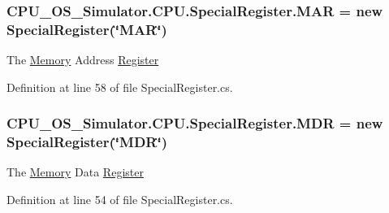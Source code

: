 \subsubsection[{M\+A\+R}]{ C\+P\+U\+\_\+\+O\+S\+\_\+\+Simulator.\+C\+P\+U.\+Special\+Register.\+M\+A\+R = new {\bf Special\+Register}(\char`\"{}M\+A\+R\char`\"{})\hspace{0.3cm}{\ttfamily [static]}}\label{class_c_p_u___o_s___simulator_1_1_c_p_u_1_1_special_register_a2ae89cee8b74f9985f43ee4e6f994bad}


The \hyperlink{namespace_c_p_u___o_s___simulator_1_1_memory}{Memory} Address \hyperlink{class_c_p_u___o_s___simulator_1_1_c_p_u_1_1_register}{Register} 



Definition at line 58 of file Special\+Register.\+cs.

\hypertarget{class_c_p_u___o_s___simulator_1_1_c_p_u_1_1_special_register_aabf7c761e1f8a9994b7c0b131c53924d}{}
\subsubsection[{M\+D\+R}]{ C\+P\+U\+\_\+\+O\+S\+\_\+\+Simulator.\+C\+P\+U.\+Special\+Register.\+M\+D\+R = new {\bf Special\+Register}(\char`\"{}M\+D\+R\char`\"{})\hspace{0.3cm}{\ttfamily [static]}}\label{class_c_p_u___o_s___simulator_1_1_c_p_u_1_1_special_register_aabf7c761e1f8a9994b7c0b131c53924d}


The \hyperlink{namespace_c_p_u___o_s___simulator_1_1_memory}{Memory} Data \hyperlink{class_c_p_u___o_s___simulator_1_1_c_p_u_1_1_register}{Register} 



Definition at line 54 of file Special\+Register.\+cs.

\hypertarget{class_c_p_u___o_s___simulator_1_1_c_p_u_1_1_special_register_ac521aef66f5fe6a88486e70f5ade8326}{}
